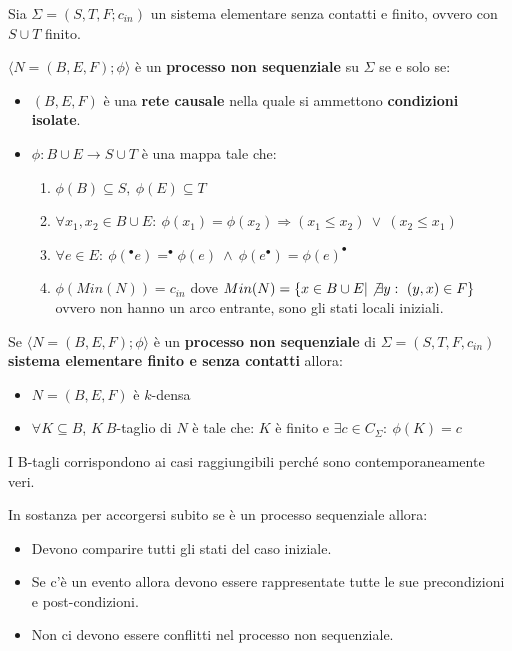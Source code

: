 \begin{definizione}
    Sia $\Sigma = (S, T, F; c_{in})$ un sistema elementare senza contatti e finito,
    ovvero con $S \cup T$ finito.

    $\langle N = (B, E, F); \phi \rangle$ è un \textbf{processo non sequenziale}
    su $\Sigma$ se e solo se:
    \begin{itemize}
        \item $(B, E, F)$ è una \textbf{rete causale} nella quale si ammettono
              \textbf{condizioni isolate}.
        \item $\phi: B \cup E \to S \cup T$ è una mappa tale che:
              \begin{enumerate}
                  \item $\phi(B) \subseteq S, \ \phi(E) \subseteq T$
                  \item $\forall x_1, x_2 \in B \cup E: \ \phi(x_1) = \phi(x_2)
                            \Rightarrow (x_1 \leq x_2) \ \lor \ (x_2 \leq x_1)$
                  \item $\forall e \in E: \ \phi(^{\bullet}e) = ^{\bullet}\phi(e)
                            \ \land \ \phi(e^{\bullet}) = \phi(e)^{\bullet}$
                  \item $\phi(Min(N)) = c_{in}$ dove
                        $Min(N) = \{x \in B \cup E | \not\exists y: \ (y, x) \in F\}$
                        ovvero non hanno un arco entrante, sono gli stati locali
                        iniziali.
              \end{enumerate}
    \end{itemize}
\end{definizione}
Se $\langle N = (B, E, F); \phi \rangle$ è un \textbf{processo non sequenziale} di
$\Sigma = (S, T, F, c_{in})$ \textbf{sistema elementare finito e senza contatti} allora:
\begin{itemize}
    \item $N = (B, E, F)$ è $k$-densa
    \item $\forall K \subseteq B$, $K\ B$-taglio di $N$ è tale che: $K$ è finito e
          $\exists c \in C_{\Sigma}: \ \phi(K) = c$
\end{itemize}
I B-tagli corrispondono ai casi raggiungibili perché sono contemporaneamente veri.
\begin{nota}
    In sostanza per accorgersi subito se è un processo sequenziale allora:
    \begin{itemize}
        \item Devono comparire tutti gli stati del caso iniziale.
        \item Se c'è un evento allora devono essere rappresentate tutte le sue
              precondizioni e post-condizioni.
        \item Non ci devono essere conflitti nel processo non sequenziale.
    \end{itemize}
\end{nota}
